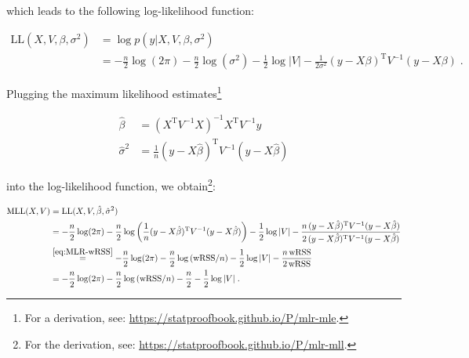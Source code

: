 \documentclass[a4paper,12pt]{article}
\begin{document}
which leads to the following log-likelihood function:

\vspace{-0.5em}
\begin{equation} \label{eq:MLR-LLF}
\begin{split}
\mathrm{LL}(X,V,\beta,\sigma^2) &= \log p(y|X,V,\beta,\sigma^2) \\
&= - \frac{n}{2} \log(2\pi) - \frac{n}{2} \log (\sigma^2) - \frac{1}{2} \log|V| - \frac{1}{2 \sigma^2} (y - X\beta)^\mathrm{T} V^{-1} (y - X\beta) \; .
\end{split}
\end{equation}

Plugging the maximum likelihood estimates\footnote{For a derivation, see: \url{https://statproofbook.github.io/P/mlr-mle}.}

\vspace{-0.5em}
\begin{equation} \label{eq:MLR-MLE}
\begin{split}
\hat{\beta} &= (X^\mathrm{T} V^{-1} X)^{-1} X^\mathrm{T} V^{-1} y \\
\hat{\sigma}^2 &= \frac{1}{n} (y-X\hat{\beta})^\mathrm{T} V^{-1} (y-X\hat{\beta})
\end{split}
\end{equation}

into the log-likelihood function, we obtain\footnote{For the derivation, see: \url{https://statproofbook.github.io/P/mlr-mll}.}:

\vspace{-0.5em}
\begin{equation} \label{eq:MLR-MLL}
\begin{split}
\mathrm{MLL}(X,V) &= \mathrm{LL}(X,V,\hat{\beta},\hat{\sigma}^2) \\
&= - \frac{n}{2} \log(2\pi) - \frac{n}{2} \log\left( \frac{1}{n} (y-X\hat{\beta})^\mathrm{T} V^{-1} (y-X\hat{\beta}) \right) - \frac{1}{2} \log|V| - \frac{n \, (y-X\hat{\beta})^\mathrm{T} V^{-1} (y-X\hat{\beta})}{2 \, (y-X\hat{\beta})^\mathrm{T} V^{-1} (y-X\hat{\beta})} \\
&\overset{\eqref{eq:MLR-wRSS}}{=} - \frac{n}{2} \log(2\pi) - \frac{n}{2} \log\left( \mathrm{wRSS}/n \right) - \frac{1}{2} \log|V| - \frac{n \, \mathrm{wRSS}}{2 \, \mathrm{wRSS}} \\
&= - \frac{n}{2} \log(2\pi) - \frac{n}{2} \log\left( \mathrm{wRSS}/n \right) - \frac{n}{2} - \frac{1}{2} \log|V| \; .
\end{split}
\end{equation}
\end{document}
